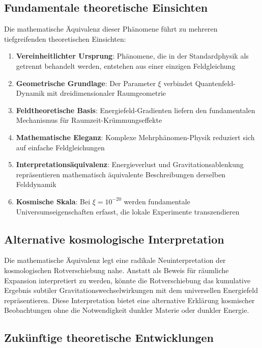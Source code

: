 \documentclass[12pt,a4paper]{article}
\theoremstyle{definition}
\begin{document}
	\subsection{Fundamentale theoretische Einsichten}
	
	Die mathematische \"Aquivalenz dieser Ph\"anomene f\"uhrt zu mehreren tiefgreifenden theoretischen Einsichten:
	
	\begin{enumerate}
		\item \textbf{Vereinheitlichter Ursprung}: Ph\"anomene, die in der Standardphysik als getrennt behandelt werden, entstehen aus einer einzigen Feldgleichung
		\item \textbf{Geometrische Grundlage}: Der Parameter $\xi$ verbindet Quantenfeld-Dynamik mit dreidimensionaler Raumgeometrie
		\item \textbf{Feldtheoretische Basis}: Energiefeld-Gradienten liefern den fundamentalen Mechanismus f\"ur Raumzeit-Kr\"ummungseffekte
		\item \textbf{Mathematische Eleganz}: Komplexe Mehrph\"anomen-Physik reduziert sich auf einfache Feldgleichungen
		\item \textbf{Interpretations\"aquivalenz}: Energieverlust und Gravitationsablenkung repr\"asentieren mathematisch \"aquivalente Beschreibungen derselben Felddynamik
		\item \textbf{Kosmische Skala}: Bei $\xi = 10^{-20}$ werden fundamentale Universumseigenschaften erfasst, die lokale Experimente transzendieren
	\end{enumerate}
	
	\subsection{Alternative kosmologische Interpretation}
	
	Die mathematische \"Aquivalenz legt eine radikale Neuinterpretation der kosmologischen Rotverschiebung nahe. Anstatt als Beweis f\"ur r\"aumliche Expansion interpretiert zu werden, k\"onnte die Rotverschiebung das kumulative Ergebnis subtiler Gravitationswechselwirkungen mit dem universellen Energiefeld repr\"asentieren. Diese Interpretation bietet eine alternative Erkl\"arung kosmischer Beobachtungen ohne die Notwendigkeit dunkler Materie oder dunkler Energie.
	
	\subsection{Zuk\"unftige theoretische Entwicklungen}
	
\end{document}

